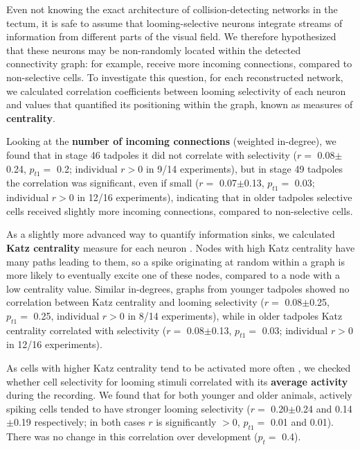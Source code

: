 \documentclass{article}
\begin{document}
Even not knowing the exact architecture of collision-detecting networks in the tectum, it is safe to assume that looming-selective neurons integrate streams of information from different parts of the visual field. We therefore hypothesized that these neurons may be non-randomly located within the detected connectivity graph: for example, receive more incoming connections, compared to non-selective cells. To investigate this question, for each reconstructed network, we calculated correlation coefficients between looming selectivity of each neuron and values that quantified its positioning within the graph, known as measures of \textbf{centrality}.

Looking at the \textbf{number of incoming connections} (weighted in-degree), we found that in stage 46 tadpoles it did not correlate with selectivity ($r=$ 0.08$\pm$0.24, $p_{t1}=$ 0.2; individual $r>$0 in 9/14 experiments), but in stage 49 tadpoles the correlation was significant, even if small ($r=$ 0.07$\pm$0.13, $p_{t1}=$ 0.03; individual $r>$0 in 12/16 experiments), indicating that in older tadpoles selective cells received slightly more incoming connections, compared to non-selective cells.

As a slightly more advanced way to quantify information sinks, we calculated \textbf{Katz centrality} measure for each neuron \citep{katz1953original,fletcher2018katz}. Nodes with high Katz centrality have many paths leading to them, so a spike originating at random within a graph is more likely to eventually excite one of these nodes, compared to a node with a low centrality value. Similar in-degrees, graphs from younger tadpoles showed no correlation between Katz centrality and looming selectivity ($r =$ 0.08$\pm$0.25, $p_{t1} =$ 0.25, individual $r>$0 in 8/14 experiments), while in older tadpoles Katz centrality correlated with selectivity ($r=$ 0.08$\pm$0.13, $p_{t1}=$ 0.03; individual $r>$0 in 12/16 experiments).

As cells with higher Katz centrality tend to be activated more often \citep{fletcher2018katz}, we checked whether cell selectivity for looming stimuli correlated with its \textbf{average activity} during the recording. We found that for both younger and older animals, actively spiking cells tended to have stronger looming selectivity ($r =$ 0.20$\pm$0.24 and 0.14$\pm$0.19 respectively; in both cases $r$ is significantly $>0$, $p_{t1}=$ 0.01 and 0.01). There was no change in this correlation over development ($p_t=$ 0.4).
\end{document}

